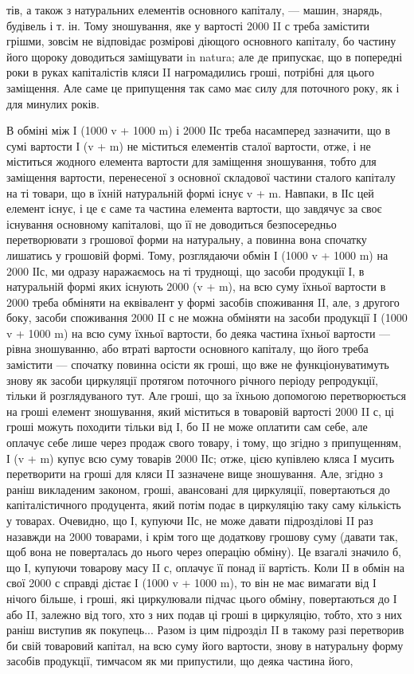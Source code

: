 тів, а також з натуральних елементів основного капіталу, — машин,
знарядь, будівель і т. ін. Тому зношування, яке у вартості 2000 II с треба
замістити грішми, зовсім не відповідає розмірові діющого основного
капіталу, бо частину його щороку доводиться заміщувати in natura; але
де припускає, що в попередні роки в руках капіталістів кляси II нагромадились
гроші, потрібні для цього заміщення. Але саме це припущення
так само має силу для поточного року, як і для минулих років.

В обміні між І (1000 v + 1000 m) і 2000 ІІс треба насамперед зазначити,
що в сумі вартости І (v + m) не міститься елементів сталої
вартости, отже, і не міститься жодного елемента вартости для заміщення
зношування, тобто для заміщення вартости, перенесеної з основної
складової частини сталого капіталу на ті товари, що в їхній натуральній
формі існує v + m. Навпаки, в ІІс цей елемент існує, і це є саме та
частина елемента вартости, що завдячує за своє існування основному капіталові,
що її не доводиться безпосередньо перетворювати з грошової
форми на натуральну, а повинна вона спочатку лишатись у грошовій
формі. Тому, розглядаючи обмін І (1000 v + 1000 m) на 2000 ІІс, ми
одразу наражаємось на ті труднощі, що засоби продукції І, в натуральній
формі яких існують 2000 (v + m), на всю суму їхньої вартости в
2000 треба обміняти на еквівалент у формі засобів споживання II, але,
з другого боку, засоби споживання 2000 II с не можна обміняти на засоби
продукції І (1000 v + 1000 m) на всю суму їхньої вартости, бо
деяка частина їхньої вартости — рівна зношуванню, або втраті вартости
основного капіталу, що його треба замістити — спочатку повинна осісти
як гроші, що вже не функціонуватимуть знову як засоби циркуляції
протягом поточного річного періоду репродукції, тільки й розглядуваного
тут. Але гроші, що за їхньою допомогою перетворюється на гроші елемент
зношування, який міститься в товаровій вартості 2000 II с, ці гроші
можуть походити тільки від І, бо II не може оплатити сам себе,
але оплачує себе лише через продаж свого товару, і тому, що згідно
з припущенням, І (v + m) купує всю суму товарів 2000 ІІс; отже, цією
купівлею кляса І мусить перетворити на гроші для кляси II зазначене
вище зношування. Але, згідно з раніш викладеним законом, гроші, авансовані
для циркуляції, повертаються до капіталістичного продуцента,
який потім подає в циркуляцію таку саму кількість у товарах. Очевидно,
що І, купуючи ІІс, не може давати підрозділові II раз назавжди на
2000 товарами, і крім того ще додаткову грошову суму (давати так,
щоб вона не поверталась до нього через операцію обміну). Це взагалі
значило б, що І, купуючи товарову масу II с, оплачує її понад ії вартість.
Коли II в обмін на свої 2000 с справді дістає І (1000 v + 1000 m),
то він не має вимагати від І нічого більше, і гроші, які циркулювали
підчас цього обміну, повертаються до І або II, залежно від того, хто з
них подав ці гроші в циркуляцію, тобто, хто з них раніш виступив як
покупець... Разом із цим підрозділ II в такому разі перетворив би свій
товаровий капітал, на всю суму його вартости, знову в натуральну форму
засобів продукції, тимчасом як ми припустили, що деяка частина його,
